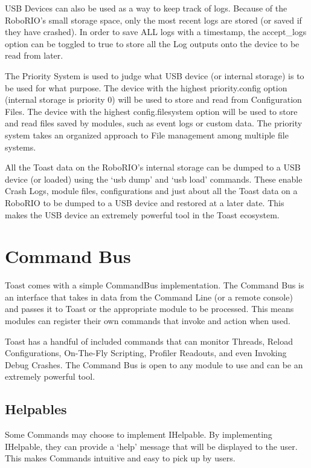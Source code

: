 \documentclass[a4paper,12pt]{article}
\begin{document}
USB Devices can also be used as a way to keep track of logs. Because of the RoboRIO's small storage space, only the most recent logs are stored (or saved if they have crashed). In order to save ALL logs with a timestamp, the accept\_logs option can be toggled to true to store all the Log outputs onto the device to be read from later. 

The Priority System is used to judge what USB device (or internal storage) is to be used for what purpose. The device with the highest priority.config option (internal storage is priority 0) will be used to store and read from Configuration Files. The device with the highest config.filesystem option will be used to store and read files saved by modules, such as event logs or custom data. The priority system takes an organized approach to File management among multiple file systems.

All the Toast data on the RoboRIO's internal storage can be dumped to a USB device (or loaded) using the `usb dump' and `usb load' commands. These enable Crash Logs, module files, configurations and just about all the Toast data on a RoboRIO to be dumped to a USB device and restored at a later date. This makes the USB device an extremely powerful tool in the Toast ecosystem.

\newpage

\section{Command Bus}
Toast comes with a simple CommandBus implementation. The Command Bus is an interface that takes in data from the Command Line (or a remote console) and passes it to Toast or the appropriate module to be processed. This means modules can register their own commands that invoke and action when used.

Toast has a handful of included commands that can monitor Threads, Reload Configurations, On-The-Fly Scripting, Profiler Readouts, and even Invoking Debug Crashes. The Command Bus is open to any module to use and can be an extremely powerful tool.

\subsection{Helpables}
Some Commands may choose to implement IHelpable. By implementing IHelpable, they can provide a `help' message that will be displayed to the user. This makes Commands intuitive and easy to pick up by users.
\end{document}
